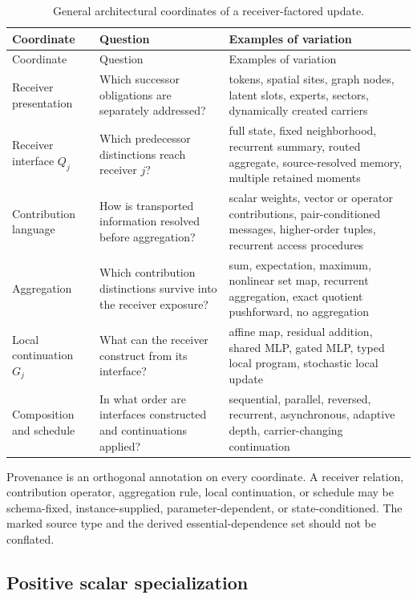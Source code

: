\begin{longtable}{@{}p{}p{}p{}@{}}
\caption{General architectural coordinates of a receiver-factored update.}\label{tab:general-coordinates}\\
\toprule
Coordinate & Question & Examples of variation \\
\midrule
\endfirsthead
\toprule
Coordinate & Question & Examples of variation \\
\midrule
\endhead
Receiver presentation & Which successor obligations are separately addressed? & tokens, spatial sites, graph nodes, latent slots, experts, sectors, dynamically created carriers \\
Receiver interface $Q_j$ & Which predecessor distinctions reach receiver $j$? & full state, fixed neighborhood, recurrent summary, routed aggregate, source-resolved memory, multiple retained moments \\
Contribution language & How is transported information resolved before aggregation? & scalar weights, vector or operator contributions, pair-conditioned messages, higher-order tuples, recurrent access procedures \\
Aggregation & Which contribution distinctions survive into the receiver exposure? & sum, expectation, maximum, nonlinear set map, recurrent aggregation, exact quotient pushforward, no aggregation \\
Local continuation $G_j$ & What can the receiver construct from its interface? & affine map, residual addition, shared MLP, gated MLP, typed local program, stochastic local update \\
Composition and schedule & In what order are interfaces constructed and continuations applied? & sequential, parallel, reversed, recurrent, asynchronous, adaptive depth, carrier-changing continuation \\
\bottomrule
\end{longtable}

Provenance is an orthogonal annotation on every coordinate. A receiver relation, contribution operator, aggregation rule, local continuation, or schedule may be schema-fixed, instance-supplied, parameter-dependent, or state-conditioned. The marked source type and the derived essential-dependence set should not be conflated.

\subsection{Positive scalar specialization}

